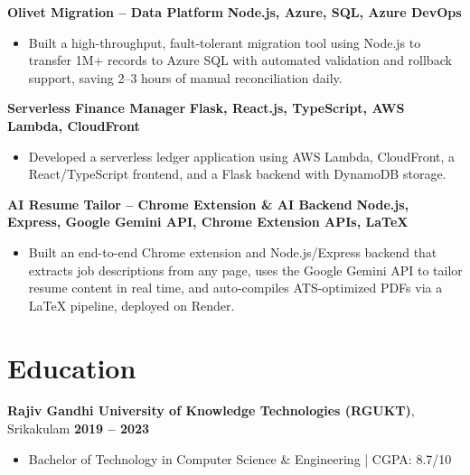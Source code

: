 \documentclass[a4paper,10pt]{article}
\begin{document}
\vspace{2pt}
\noindent\textbf{Olivet Migration -- Data Platform} \hfill \textbf{Node.js, Azure, SQL, Azure DevOps}
\begin{itemize}
    \item Built a high-throughput, fault-tolerant migration tool using Node.js to transfer 1M+ records to Azure SQL with automated validation and rollback support, saving 2--3 hours of manual reconciliation daily.
\end{itemize}

\vspace{2pt}
\noindent\textbf{Serverless Finance Manager} \hfill \textbf{Flask, React.js, TypeScript, AWS Lambda, CloudFront}
\begin{itemize}
    \item Developed a serverless ledger application using AWS Lambda, CloudFront, a React/TypeScript frontend, and a Flask backend with DynamoDB storage.
\end{itemize}

\vspace{2pt}
\noindent\textbf{AI Resume Tailor -- Chrome Extension \& AI Backend} \hfill \textbf{Node.js, Express, Google Gemini API, Chrome Extension APIs, LaTeX}
\begin{itemize}
    \item Built an end-to-end Chrome extension and Node.js/Express backend that extracts job descriptions from any page, uses the Google Gemini API to tailor resume content in real time, and auto-compiles ATS-optimized PDFs via a LaTeX pipeline, deployed on Render.
\end{itemize}

\section{Education}
\noindent\textbf{Rajiv Gandhi University of Knowledge Technologies (RGUKT)}, Srikakulam \hfill \textbf{2019 -- 2023}
\begin{itemize}
    \item Bachelor of Technology in Computer Science \& Engineering | CGPA: 8.7/10
\end{itemize}
\end{document}
